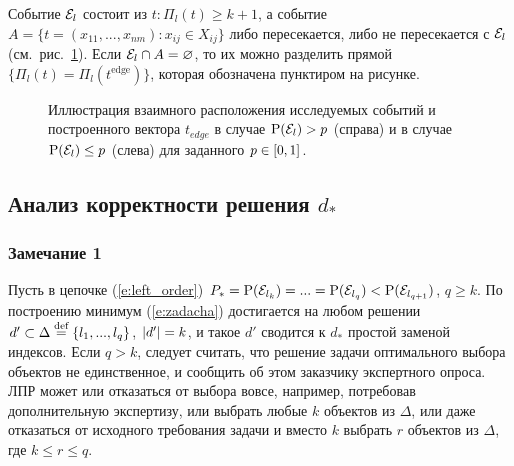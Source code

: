 Событие $\mathcal{E}_l$ состоит из $t: \Pi_l(t) \geq k+1$, а событие $A = \{t = (x_{11}, ..., x_{nm}): x_{ij} \in X_{ij}\}$ либо пересекается, либо не пересекается с $\mathcal{E}_l$ (см.~рис.~\ref{ris:algo_sets}). Если $\mathcal{E}_l\cap A=\varnothing$, то их можно разделить прямой $\{\Pi_l(t) = \Pi_l(t^\text{edge})\}$, которая обозначена пунктиром на рисунке.

\begin{figure}[h]
\caption{\small Иллюстрация взаимного расположения исследуемых событий и построенного вектора $t_{edge}$ в случае ${\mathrm{P}}(\mathcal{E}_l) > p$ (справа) и в случае ${\mathrm{P}}(\mathcal{E}_l) \leq p$ (слева) для заданного $p \in [0,1]$.}
\label{ris:algo_sets}
\end{figure}


\subsection{Анализ корректности решения $d_*$}
\subsubsection*{Замечание 1}

Пусть в цепочке (\ref{e:left_order}) $P_* = {\mathrm{P}}(\mathcal{E}_{l_k}) = ... = {\mathrm{P}}(\mathcal{E}_{l_q}) < {\mathrm{P}}(\mathcal{E}_{l_{q+1}})$, $q \geq k$. По построению минимум (\ref{e:zadacha}) достигается на любом решении $d' \subset \Delta \overset{\text{def}}{=} \{l_1, ..., l_q\}$, $\left| d' \right| = k$, и такое $d'$ сводится к $d_*$ простой заменой индексов. Если $q > k$, следует считать, что решение задачи оптимального выбора объектов не единственное, и сообщить об этом заказчику экспертного опроса. ЛПР может или отказаться от выбора вовсе, например, потребовав дополнительную экспертизу, или выбрать любые $k$ объектов из $\Delta$, или даже отказаться от исходного требования задачи и вместо $k$ выбрать $r$ объектов из $\Delta$, где $k \leq r \leq q$.


